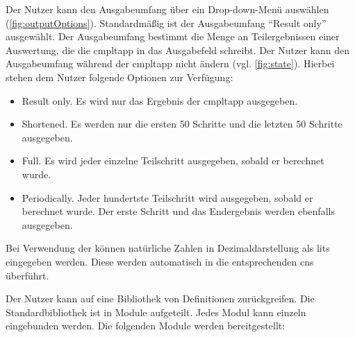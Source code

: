 \documentclass[parskip=full,11pt,twoside]{scrartcl}
\begin{document}
Der Nutzer kann den Ausgabeumfang über ein Drop-down-Menü auswählen (\cref{fig:outputOptions}). 
Standardmäßig ist der Ausgabeumfang ``Result only'' ausgewählt. 
Der Ausgabeumfang bestimmt die Menge an Teilergebnissen einer Auswertung, die die \gls{cmpltapp} in das Ausgabefeld schreibt.
Der Nutzer kann den Ausgabeumfang während der \gls{cmpltapp} nicht ändern (vgl. \cref{fig:state}).
Hierbei stehen dem Nutzer folgende Optionen zur Verfügung:
\begin{itemize}
	\item Result only. Es wird nur das Ergebnis der \gls{cmpltapp} ausgegeben.
	\item Shortened. Es werden nur die ersten 50 Schritte und die letzten 50 Schritte ausgegeben.
	\item Full. Es wird jeder einzelne Teilschritt ausgegeben, sobald er berechnet wurde.
	\item Periodically. Jeder hundertste Teilschritt wird ausgegeben, sobald er berechnet wurde. 
	Der erste Schritt und das Endergebnis werden ebenfalls ausgegeben.
\end{itemize}


Bei Verwendung der  können natürliche
Zahlen in Dezimaldarstellung als \glspl{lit} eingegeben werden. Diese werden automatisch in die
entsprechenden \glspl{cn} überführt.

Der Nutzer kann auf eine Bibliothek von Definitionen zurückgreifen. Die Standardbibliothek
ist in Module aufgeteilt. Jedes Modul kann einzeln eingebunden werden. Die folgenden
Module werden bereitgestellt:
\end{document}
